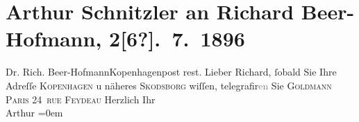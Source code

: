 

         
         \renewcommand{\erwaehntePersonen}{Personen: Richard Beer-Hofmann, Paul Goldmann}
         \renewcommand{\erwaehnteOrte}{Orte: Kopenhagen, Oslo, Paris, Skodsborg, rue Feydeau}
         \renewcommand{\erwaehnteWerke}{}
               \section[Arthur Schnitzler an Richard Beer-Hofmann, 2{[}6?{]}. 7. 1896]{ Arthur Schnitzler an Richard Beer-Hofmann, 2{[}6?{]}. 7. 1896}\nopagebreak{}\rehead{ }\begin{ledgroupsized}[t]{13cm}\normalsize\beginnumbering \toendnotes[C]{\smallbreak\pagebreak[2]} 
\pstart{}{\pb}Dr.  Rich.
                  Beer-Hofmann\pend{}\pstart{}Kopenhagen\pend{}\pstart{}post rest.\pend{}{\bigskip}\pstart
           \noindent{}{\pb}Lieber Richard, { }ſobald Sie Ihre Adreſſe \textsc{Kopenhagen} u näheres \textsc{Skodsborg} wiſſen, telegrafir\textcolor{gray}{en} Sie \textsc{Goldmann}{ }\textsc{Paris}{ }\textsc{24 rue Feydeau}\pend
           \pstart
           Herzlich Ihr{\\[\baselineskip]}Arthur\pend
           \leftskip=0em{}
         
         \endnumbering{}\end{ledgroupsized}  \newcommand{\dateiname}{L00569}\newcommand{\titel}{Arthur Schnitzler an Richard Beer-Hofmann, 2[6?]. 7. 1896}\newcommand{\editorInnen}{Martin Anton Müller und Gerd-Hermann Susen}
      